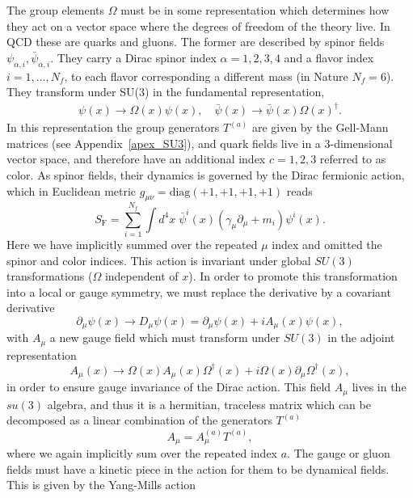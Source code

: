 The group elements $\Omega$ must be in some representation which determines how they act on a vector space where the degrees of freedom of the theory live. In QCD these are quarks and gluons. The former are described by spinor fields $\psi_{\alpha,i},\bar{\psi}_{\alpha,i}$. They carry a Dirac spinor index $\alpha=1,2,3,4$ and a flavor index $i=1,...,N_f$, to each flavor corresponding a different mass (in Nature $N_f=6$). They transform under SU(3) in the fundamental representation,
\begin{gather}
\psi(x)\to\Omega(x)\psi(x), \quad \bar{\psi}(x)\to\bar{\psi}(x)\Omega(x)^{\dagger}.
\end{gather}
In this representation the group generators $T^{(a)}$ are given by the Gell-Mann matrices (see Appendix~\ref{apex_SU3}), and quark fields live in a 3-dimensional vector space, and therefore have an additional index $c=1,2,3$ referred to as color. As spinor fields, their dynamics is governed by the Dirac fermionic action, which in Euclidean metric $g_{\mu\nu}=\textrm{diag}(+1,+1,+1,+1)$ reads
\begin{equation}
S_{\textrm{F}}=\sum_{i=1}^{N_f}\int d^4x\;\bar{\psi}^{i}(x)\left(\gamma_{\mu}\partial_{\mu}+m_i\right)\psi^i(x).
\end{equation} 
Here we have implicitly summed over the repeated $\mu$ index and omitted the spinor and color indices. This action is invariant under global $SU(3)$ transformations ($\Omega$ independent of $x$). In order to promote this transformation into a local or gauge symmetry, we must replace the derivative by a covariant derivative
\begin{equation}
\partial_{\mu}\psi(x)\to D_{\mu}\psi(x)=\partial_{\mu}\psi(x)+iA_{\mu}(x)\psi(x),
\end{equation}
with $A_{\mu}$ a new gauge field which must transform under $SU(3)$ in the adjoint representation
\begin{equation}
\label{ch_foundation:eq:Agauge}
A_{\mu}(x)\to\Omega(x)A_{\mu}(x)\Omega^{\dagger}(x)+i\Omega(x)\partial_{\mu}\Omega^{\dagger}(x),
\end{equation}
in order to ensure gauge invariance of the Dirac action. This field $A_{\mu}$ lives in the $su(3)$ algebra, and thus it is a hermitian, traceless matrix which can be decomposed as a linear combination of the generators $T^{(a)}$
\begin{equation}
A_{\mu}=A_{\mu}^{(a)}T^{(a)},
\end{equation}
where we again implicitly sum over the repeated index $a$. The gauge or gluon fields must have a kinetic piece in the action for them to be dynamical fields. This is given by the Yang-Mills action
